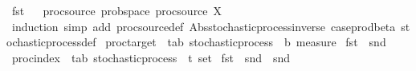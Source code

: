 \begin{isabellebody}
\ {\isachardoublequoteopen}fst{\isachardoublequoteclose}%
\isadelimproof
\ %
\endisadelimproof
%
\isatagproof
\isacommand{{\isachardot}{\kern0pt}}\isamarkupfalse%
%
\endisatagproof
{\isafoldproof}%
%
\isadelimproof
%
\endisadelimproof
\isanewline
\isanewline
{}\isamarkupfalse%
\ proc{\isacharunderscore}{\kern0pt}source{\isacharcolon}{\kern0pt}\ prob{\isacharunderscore}{\kern0pt}space\ {\isachardoublequoteopen}proc{\isacharunderscore}{\kern0pt}source\ X{\isachardoublequoteclose}\isanewline
%
\isadelimproof
\ \ %
\endisadelimproof
%
\isatagproof
{}\isamarkupfalse%
\ {\isacharparenleft}{\kern0pt}induction{\isacharcomma}{\kern0pt}\ simp\ add{\isacharcolon}{\kern0pt}\ proc{\isacharunderscore}{\kern0pt}source{\isacharunderscore}{\kern0pt}def\ Abs{\isacharunderscore}{\kern0pt}stochastic{\isacharunderscore}{\kern0pt}process{\isacharunderscore}{\kern0pt}inverse\ case{\isacharunderscore}{\kern0pt}prod{\isacharunderscore}{\kern0pt}beta{\isacharprime}{\kern0pt}\ stochastic{\isacharunderscore}{\kern0pt}process{\isacharunderscore}{\kern0pt}def{\isacharparenright}{\kern0pt}%
\endisatagproof
{\isafoldproof}%
%
\isadelimproof
\isanewline
%
\endisadelimproof
\isanewline
{}\isamarkupfalse%
\ proc{\isacharunderscore}{\kern0pt}target\ {\isacharcolon}{\kern0pt}{\isacharcolon}{\kern0pt}\ {\isachardoublequoteopen}{\isacharparenleft}{\kern0pt}{\isacharprime}{\kern0pt}t{\isacharcomma}{\kern0pt}{\isacharprime}{\kern0pt}a{\isacharcomma}{\kern0pt}{\isacharprime}{\kern0pt}b{\isacharparenright}{\kern0pt}\ stochastic{\isacharunderscore}{\kern0pt}process\ {\isasymRightarrow}\ {\isacharprime}{\kern0pt}b\ measure{\isachardoublequoteclose}\isanewline
{}\ {\isachardoublequoteopen}fst\ {\isasymcirc}\ snd{\isachardoublequoteclose}%
\isadelimproof
\ %
\endisadelimproof
%
\isatagproof
\isacommand{{\isachardot}{\kern0pt}}\isamarkupfalse%
%
\endisatagproof
{\isafoldproof}%
%
\isadelimproof
%
\endisadelimproof
\isanewline
\isanewline
{}\isamarkupfalse%
\ proc{\isacharunderscore}{\kern0pt}index\ {\isacharcolon}{\kern0pt}{\isacharcolon}{\kern0pt}\ {\isachardoublequoteopen}{\isacharparenleft}{\kern0pt}{\isacharprime}{\kern0pt}t{\isacharcomma}{\kern0pt}{\isacharprime}{\kern0pt}a{\isacharcomma}{\kern0pt}{\isacharprime}{\kern0pt}b{\isacharparenright}{\kern0pt}\ stochastic{\isacharunderscore}{\kern0pt}process\ {\isasymRightarrow}\ {\isacharprime}{\kern0pt}t\ set{\isachardoublequoteclose}\isanewline
{}\ {\isachardoublequoteopen}fst\ {\isasymcirc}\ snd\ {\isasymcirc}\ snd{\isachardoublequoteclose}%

\end{isabellebody}
